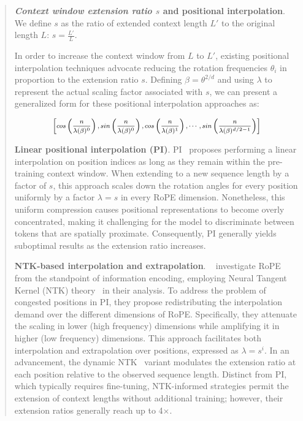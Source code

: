 \begin{abstract}
\textbf{\emph{Context window extension ratio $s$} and positional interpolation}. We define $s$ as  the ratio of extended context length $L'$ to the original length $L$: $s=\frac{L'}{L}$. 

In order to increase the context window from $L$ to $L'$, existing positional interpolation techniques advocate reducing the rotation frequencies $\theta_i$ in proportion to the extension ratio $s$. Defining $\beta = \theta^{2/d}$ and using $\lambda$ to represent the actual scaling factor associated with $s$, we can present a generalized form for these positional interpolation approaches as:

\begin{equation}	
	\fontsize{7.5}{7.5} \selectfont
	\label{eq:unified_rope}
	\begin{aligned}
		\left[cos\left(\frac{n}{\lambda(\beta)^0}\right), sin \left(\frac{n}{\lambda(\beta)^0}\right), cos\left(\frac{n}{\lambda(\beta)^1}\right), \cdots,  sin \left(\frac{n}{\lambda(\beta)^{d/2-1}}\right) \right]   
	\end{aligned}
\end{equation}

\textbf{Linear positional interpolation (PI)}. PI~\cite{pi} proposes performing a linear interpolation on position indices as long as they remain within the pre-training context window. When extending to a new sequence length by a factor of $s$, this approach scales down the rotation angles for every position uniformly by a factor $\lambda=s$ in every RoPE dimension. Nonetheless, this uniform compression causes positional representations to become overly concentrated, making it challenging for the model to discriminate between tokens that are spatially proximate. Consequently, PI generally yields suboptimal results as the extension ratio increases.

\textbf{NTK-based interpolation and extrapolation}. ~\cite{ntk,dynamicntk} investigate RoPE from the standpoint of information encoding, employing Neural Tangent Kernel (NTK) theory~\cite{jacot2018neural,tancik2020fourier} in their analysis. To address the problem of congested positions in PI, they propose redistributing the interpolation demand over the different dimensions of RoPE. Specifically, they attenuate the scaling in lower (high frequency) dimensions while amplifying it in higher (low frequency) dimensions. This approach facilitates both interpolation and extrapolation over positions, expressed as $\lambda=s^{i}$. In an advancement, the dynamic NTK~\cite{dynamicntk} variant modulates the extension ratio at each position relative to the observed sequence length. Distinct from PI, which typically requires fine-tuning, NTK-informed strategies permit the extension of context lengths without additional training; however, their extension ratios generally reach up to 4$\times$.


\end{abstract}
